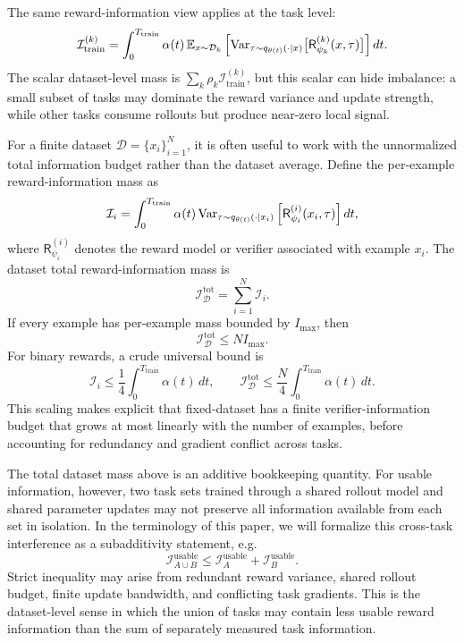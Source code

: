 The same reward-information view applies at the task level:
\[
  \mathcal{I}_{\mathrm{train}}^{(k)}
  =
  \int_0^{T_{\mathrm{train}}}
  \alpha(t)\,
  \mathbb{E}_{x\sim\mathcal{D}_k}
  \left[
    \mathrm{Var}_{\tau\sim q_{\theta(t)}(\cdot\mid x)}
    \big[
      \mathsf{R}_{\psi_k}^{(k)}(x,\tau)
    \big]
  \right]
  dt.
\]
The scalar dataset-level mass is $\sum_k \rho_k \mathcal{I}_{\mathrm{train}}^{(k)}$, but this scalar can hide imbalance: a small subset of tasks may dominate the reward variance and update strength, while other tasks consume rollouts but produce near-zero local signal.

For a finite dataset $\mathcal{D}=\{x_i\}_{i=1}^N$, it is often useful to work with the unnormalized total information budget rather than the dataset average. Define the per-example reward-information mass as
\[
  \mathcal{I}_i
  =
  \int_0^{T_{\mathrm{train}}}
  \alpha(t)\,
  \mathrm{Var}_{\tau\sim q_{\theta(t)}(\cdot\mid x_i)}
  \left[
    \mathsf{R}_{\psi_i}^{(i)}(x_i,\tau)
  \right]
  dt,
\]
where $\mathsf{R}_{\psi_i}^{(i)}$ denotes the reward model or verifier associated with example $x_i$. The dataset total reward-information mass is
\[
  \mathcal{I}_{\mathcal{D}}^{\mathrm{tot}}
  =
  \sum_{i=1}^N \mathcal{I}_i.
\]
If every example has per-example mass bounded by $I_{\max}$, then
\[
  \mathcal{I}_{\mathcal{D}}^{\mathrm{tot}}
  \le
  N I_{\max}.
\]
For binary rewards, a crude universal bound is
\[
  \mathcal{I}_i
  \le
  \frac{1}{4}
  \int_0^{T_{\mathrm{train}}}
  \alpha(t)\,dt,
  \qquad
  \mathcal{I}_{\mathcal{D}}^{\mathrm{tot}}
  \le
  \frac{N}{4}
  \int_0^{T_{\mathrm{train}}}
  \alpha(t)\,dt.
\]
This scaling makes explicit that fixed-dataset \llm{} \rlvr{} has a finite verifier-information budget that grows at most linearly with the number of examples, before accounting for redundancy and gradient conflict across tasks.

\begin{discussionbox}[title={Claim to prove: subadditivity across task sets}]
The total dataset mass above is an additive bookkeeping quantity. For usable information, however, two task sets trained through a shared rollout model and shared parameter updates may not preserve all information available from each set in isolation. In the terminology of this paper, we will formalize this cross-task interference as a subadditivity statement, e.g.
\[
  \mathcal{I}_{A\cup B}^{\mathrm{usable}}
  \le
  \mathcal{I}_{A}^{\mathrm{usable}}
  +
  \mathcal{I}_{B}^{\mathrm{usable}}.
\]
Strict inequality may arise from redundant reward variance, shared rollout budget, finite update bandwidth, and conflicting task gradients. This is the dataset-level sense in which the union of tasks may contain less usable reward information than the sum of separately measured task information.
\end{discussionbox}

